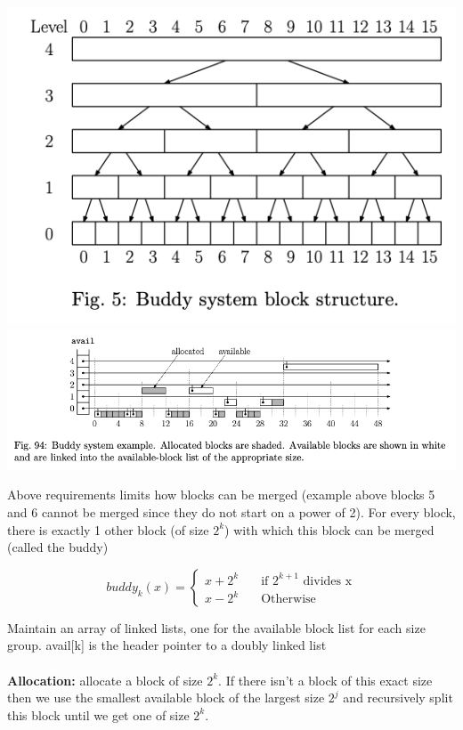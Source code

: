 \documentclass{article}
\begin{document}
  \begin{center}
    \includegraphics[scale=0.3]{BuddySystem}
    \includegraphics[scale=0.7]{BuddySystemExample}
  \end{center}
  Above requirements limits how blocks can be merged (example above blocks 5 and 6 cannot be merged since they do not start on a power of 2). For every block, there is exactly 1 other block (of size $2^{k}$) with which this block can be merged (called the buddy)
  \begin{center}
    \[
      buddy_{k}(x) = \left\{
        \begin{array}{ll}
          x + 2^{k} & \quad \text{if } 2^{k+1} \text{ divides x} \\
          x - 2^{k} & \quad \text{Otherwise}
        \end{array}
    \right.
  \]
  \end{center}
  Maintain an array of linked lists, one for the available block list for each size group. avail[k] is the header pointer to a doubly linked list\\ \\
  \textbf{Allocation: }allocate a block of size $2^{k}$. If there isn't a block of this exact size then we use the smallest available block of the largest size $2^{j}$ and recursively split this block until we get one of size $2^{k}$.
\end{document}
